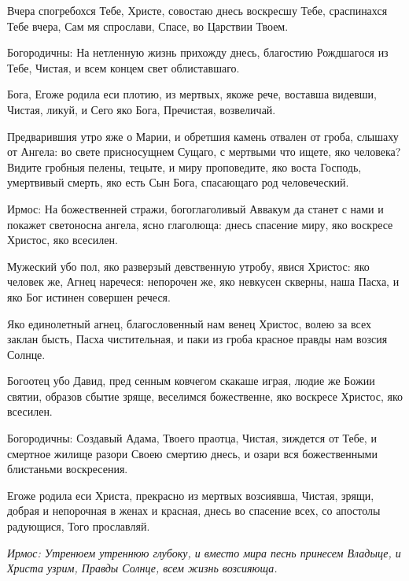 Вчера спогребохся Тебе, Христе, совостаю днесь воскресшу Тебе, сраспинахся Тебе вчера, Сам мя спрослави, Спасе, во Царствии Твоем. \itshape 

Богородичны\normalfont{}: На нетленную жизнь прихожду днесь, благостию Рождшагося из Тебе, Чистая, и всем концем свет облиставшаго. 



Бога, Егоже родила еси плотию, из мертвых, якоже рече, воставша видевши, Чистая, ликуй, и Сего яко Бога, Пречистая, возвеличай. 



Предварившия утро яже о Марии, и обретшия камень отвален от гроба, слышаху от Ангела: во свете присносущнем Сущаго, с мертвыми что ищете, яко человека? Видите гробныя пелены, тецыте, и миру проповедите, яко воста Господь, умертвивый смерть, яко есть Сын Бога, спасающаго род человеческий.


\itshape 

Ирмос\normalfont{}: На божественней стражи, богоглаголивый Аввакум да станет с нами и покажет светоносна ангела, ясно глаголюща: днесь спасение миру, яко воскресе Христос, яко всесилен. 



Мужеский убо пол, яко разверзый девственную утробу, явися Христос: яко человек же, Агнец наречеся: непорочен же, яко невкусен скверны, наша Пасха, и яко Бог истинен совершен речеся. 



Яко единолетный агнец, благословенный нам венец Христос, волею за всех заклан бысть, Пасха чистительная, и паки из гроба красное правды нам возсия Солнце. 



Богоотец убо Давид, пред сенным ковчегом скакаше играя, людие же Божии святии, образов сбытие зряще, веселимся божественне, яко воскресе Христос, яко всесилен. \itshape 

Богородичны\normalfont{}: Создавый Адама, Твоего праотца, Чистая, зиждется от Тебе, и смертное жилище разори Своею смертию днесь, и озари вся божественными блистаньми воскресения. 



Егоже родила еси Христа, прекрасно из мертвых возсиявша, Чистая, зрящи, добрая и непорочная в женах и красная, днесь во спасение всех, со апостолы радующися, Того прославляй.



\itshape Ирмос\normalfont{}: Утренюем утреннюю глубоку, и вместо мира песнь принесем Владыце, и Христа узрим, Правды Солнце, всем жизнь возсияюща. 



